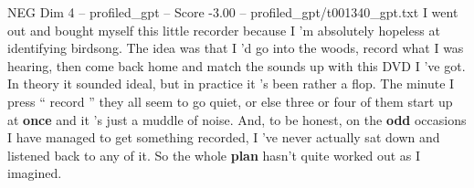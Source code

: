 \begin{textsample}{NEG Dim 4 – profiled\_gpt – Score -3.00 – profiled\_gpt/t001340\_gpt.txt}  \label{ex:f4_neg_005}
I went out and bought myself this little recorder because I ’m absolutely hopeless at identifying birdsong.
The idea was that I ’d go into the woods, record what I was hearing, then come back home and match the sounds up with this DVD I ’ve got.
In theory it sounded ideal, but in practice it ’s been rather a flop.
The minute I press “ record ” they all seem to go quiet, or else three or four of them start up at \textbf{once} and it ’s just a muddle of noise.
And, to be honest, on the \textbf{odd} occasions I have managed to get something recorded, I ’ve never actually sat down and listened back to any of it.
So the whole \textbf{plan} hasn't quite worked out as I imagined.

\end{textsample}

